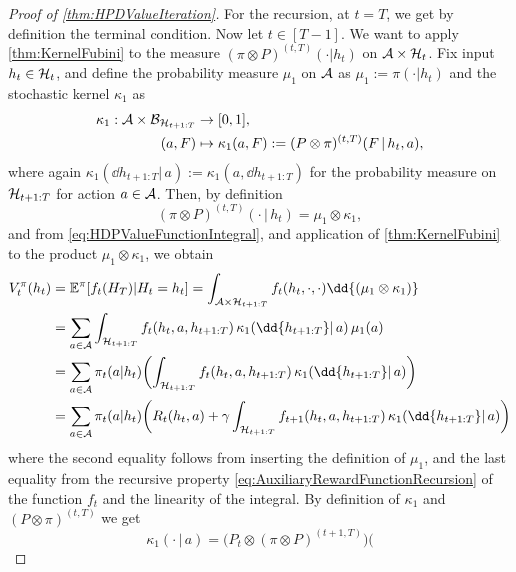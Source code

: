 \documentclass[
    a4paper,
    11pt,
    bibliography=totoc,
    listof=totoc,      
    headinclude=true,
    cleardoublepage=empty,
]{scrbook}
\theoremstyle{plain}
\theoremstyle{definition}
\theoremstyle{remark}
\newcommand{\E}{\mathbb E}
\newcommand{\SpaceA}{{\cal A}}
\newcommand{\SpaceH}{{\cal H}}
\begin{document}
\begin{proof}[Proof of \cref{thm:HPDValueIteration}]
    For the recursion, at $t=T$, we get by definition the terminal condition. 
    Now let $t\in[T-1]$. We want to apply \cref{thm:KernelFubini} to the 
    measure $(\pi\otimes P)^{(t,T)}(\cdot|h_t)$ on $\SpaceA\times\SpaceH_t$. 
    Fix input $h_t\in\SpaceH_t$, and define the probability measure $\mu_1$ on 
    $\SpaceA$ as $\mu_1 := \pi(\cdot|h_t)$ and the stochastic kernel 
    $\kappa_1$ as
    \begin{align*}
        \kappa_1: 
            \SpaceA \times \mathcal{B}_{\SpaceH_{t+1:T}} &\to [0,1], \\
        (a, F) &\mapsto \kappa_1(a,F) 
            := (P\otimes\pi)^{(t,T)}(F\,|\,h_t,a),
    \end{align*}
    where again $\kappa_1(\dd{h_{t+1:T}}|\,a) :=  \kappa_1(a,
    \dd{h_{t+1:T}})$ for the probability measure on $\SpaceH_{t+1:T}$ for
    action $a\in\SpaceA$. Then, by definition 
   \[
        (\pi\otimes P)^{(t,T)}(\cdot\,|\,h_t) 
        = \mu_1 \otimes \kappa_1,
    \]
    and from \cref{eq:HDPValueFunctionIntegral}, and application of 
    \cref{thm:KernelFubini} to the product $\mu_1\otimes\kappa_1$, we obtain 
    \begin{align}
        V_t^\pi(h_t) 
        &= \E^\pi[f_t(H_T)|H_t=h_t] 
        = \int_{\SpaceA \times \SpaceH_{t+1:T}} f_t(h_t,\cdot, \cdot)
            \dd{(\mu_1\otimes\kappa_1)} 
        \nonumber \\
        &= \sum_{a\in\SpaceA} \int_{\SpaceH_{t+1:T}} 
            f_t(h_t,a,h_{t+1:T}) \, 
                \kappa_1(\dd{h_{t+1:T}} |\, a)\, \mu_1(a) 
        \nonumber \\
        &= \sum_{a\in\SpaceA} \pi_t(a|h_t) \biggl(
            \int_{\SpaceH_{t+1:T}} 
                f_t(h_t,a,h_{t+1:T}) \, 
            \kappa_1(\dd{h_{t+1:T}} |\, a) 
        \biggr)
        \nonumber \\        
        &= \sum_{a\in\SpaceA} \pi_t(a|h_t) \biggl(
            R_t(h_t, a) + \gamma 
            \int_{\SpaceH_{t+1:T}} f_{t+1}(h_t, a, h_{t+1:T}) \,
                \kappa_1(\dd{h_{t+1:T}} |\, a)    
        \biggr) 
        \label{eq:ProofValueIterationFirstStep}
    \end{align}    
    where the second equality follows from inserting the definition of 
    $\mu_1$, and the last equality from the recursive property
    \eqref{eq:AuxiliaryRewardFunctionRecursion} of the function $f_t$ and the
    linearity of the integral. By definition of $\kappa_1$ and 
    $(P\otimes\pi)^{(t,T)}$ we get
    \[
        \kappa_1(\cdot \,|\,a) 
        = \bigl(P_t\otimes (\pi\otimes P)^{(t+1,T)}\bigr)(
\]
\end{proof}
\end{document}
